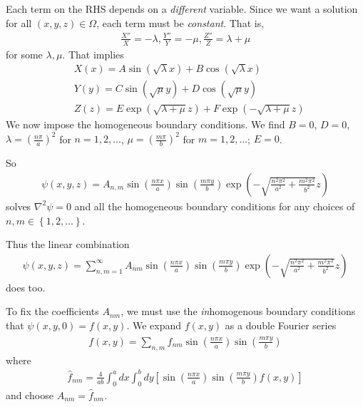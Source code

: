 \documentclass[a4paper]{article}
\begin{document}
Each term on the RHS depends on a \emph{different} variable. Since we want a solution for all $\left(x,y,z\right) \in \Omega$, each term must be \emph{constant}. That is,
\begin{equation*}
\begin{aligned}
\frac{X''}{X} = -\lambda, \frac{Y''}{Y} = -\mu,\frac{Z''}{Z} = \lambda+\mu
\end{aligned}
\end{equation*}
for some $\lambda,\mu$. That implies
\begin{equation*}
\begin{aligned}
&X\left(x\right) = A\sin\left(\sqrt{\lambda}x\right) + B\cos\left(\sqrt{\lambda}x\right)\\
&Y\left(y\right) = C\sin\left(\sqrt{\mu}y\right) + D\cos\left(\sqrt{\mu}y\right)\\
&Z\left(z\right) = E\exp\left(\sqrt{\lambda+\mu}z\right) + F\exp\left(-\sqrt{\lambda+\mu}z\right)
\end{aligned}
\end{equation*}
We now impose the homogeneous boundary conditions. We find $B=0$, $D=0$, $\lambda = \left(\frac{n\pi}{a}\right)^2$ for $n=1,2,...$, $\mu = \left(\frac{m\pi}{b}\right)^2$ for $m=1,2,...$; $E=0$.

So
\begin{equation*}
\begin{aligned}
\psi\left(x,y,z\right) = A_{n,m} \sin\left(\frac{n\pi x}{a}\right)\sin \left(\frac{m\pi y}{b}\right) \exp\left(-\sqrt{\frac{n^2 \pi^2}{a^2} + \frac{m^2\pi^2}{b^2}} z\right)
\end{aligned}
\end{equation*}
solves $\nabla^2 \psi=0$ and all the homogeneous boundary conditions for any choices of $n,m \in\left\{1,2,...\right\}$.

Thus the linear combination
\begin{equation*}
\begin{aligned}
\psi\left(x,y,z\right) = \sum_{n,m=1}^\infty A_{nm} \sin\left(\frac{n\pi x}{a}\right) \sin\left(\frac{m\pi y}{b}\right) \exp\left(-\sqrt{\frac{n^2 \pi^2}{a^2} + \frac{m^2\pi^2}{b^2}} z\right)
\end{aligned}
\end{equation*}
does too.

To fix the coefficients $A_{nm}$, we must use the \emph{in}homogenous boundary conditions that $\psi\left(x,y,0\right) = f\left(x,y\right)$. We expand $f\left(x,y\right)$ as a double Fourier series
\begin{equation*}
\begin{aligned}
f\left(x,y\right) = \sum_{n,m} \hat{f}_{nm} \sin\left(\frac{n\pi x}{a}\right) \sin\left(\frac{m\pi y}{b}\right)
\end{aligned}
\end{equation*}
where 
\begin{equation*}
\begin{aligned}
\hat{f}_{nm} = \frac{4}{ab} \int_0^a dx \int_0^b dy \left[\sin\left(\frac{n\pi x}{a}\right)\sin\left(\frac{m\pi y}{b}\right) f\left(x,y\right)\right]
\end{aligned}
\end{equation*}
and choose $A_{nm} = \hat{f}_{nm}$.
\end{document}
